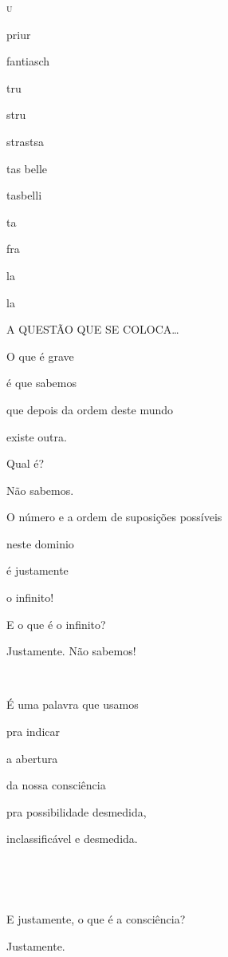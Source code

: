 \textsc{u}






\begin{center}
priur

fantiasch

tru

stru

strastsa

tas belle

tasbelli

ta

fra

la

la
\end{center}

A QUESTÃO QUE SE COLOCA\ldots{}

O que é grave

é que sabemos

que depois da ordem deste mundo

existe outra.

Qual é?

Não sabemos.

O número e a ordem de suposições possíveis

neste dominio

é justamente

o infinito!


E o que é o infinito?

Justamente. Não sabemos!

~

É uma palavra que usamos

pra indicar

a abertura

da nossa consciência

pra possibilidade desmedida, 

inclassificável e desmedida.

~


~

E justamente, o que é a consciência?

Justamente.

